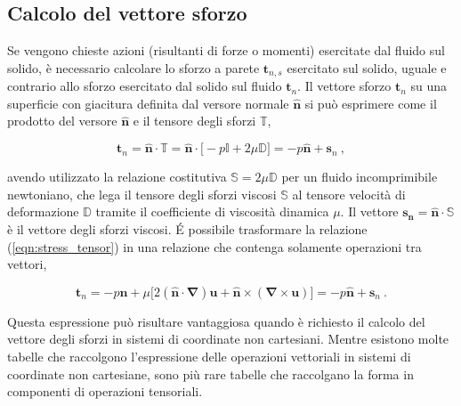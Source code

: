 \subsection{Calcolo del vettore sforzo}
Se vengono chieste azioni (risultanti di forze o momenti) esercitate dal fluido
 sul solido, è necessario calcolare lo sforzo a parete $\bm{t}_{n,s}$ esercitato
 sul solido, uguale e contrario allo sforzo esercitato dal solido sul fluido
 $\bm{t}_{n}$.
Il vettore sforzo $\bm{t}_n$ su una superficie con giacitura definita dal
 versore normale $\bm{\hat{n}}$ si può esprimere come il prodotto del versore $\bm{\hat{n}}$ e il tensore degli sforzi $\mathbb{T}$,
\begin{fBox}
\begin{equation}\label{eqn:stress_tensor}
 \bm{t}_n = \bm{\hat{n}} \cdot \mathbb{T} =
 \bm{\hat{n}} \cdot \big[-p\mathbb{I} + 2\mu\mathbb{D} \big] = 
  - p\bm{\hat{n}} + \bm{s}_n \ ,
\end{equation}
\end{fBox}
avendo utilizzato la relazione costitutiva $\mathbb{S} = 2 \mu \mathbb{D}$ per un fluido incomprimibile newtoniano, che lega il tensore degli sforzi viscosi $\mathbb{S}$ al tensore velocità di deformazione $\mathbb{D}$ tramite il coefficiente di viscosità dinamica $\mu$. Il vettore $\bm{s_n} = \bm{\hat{n}} \cdot \mathbb{S}$ è il vettore degli sforzi viscosi.
%
%
 \'E possibile trasformare la relazione (\ref{eqn:stress_tensor}) in una relazione che contenga solamente operazioni tra vettori,
\begin{fBox}
\begin{equation}\label{eqn:stress_vector}
 \bm{t}_n = -p \bm{\hat{n}} +
 \mu \big[2 (\bm{\hat{n}} \cdot \bm{\nabla}) \bm{u} +
  \bm{\hat{n}} \times (\bm{\nabla} \times \bm{u}) \big]  = 
  - p\bm{\hat{n}} + \bm{s}_n \ .
\end{equation}
\end{fBox}
Questa espressione può risultare vantaggiosa quando è richiesto il calcolo del vettore degli sforzi in sistemi di coordinate non cartesiani. Mentre esistono molte tabelle che raccolgono l'espressione delle operazioni vettoriali in sistemi di coordinate non cartesiane, sono più rare tabelle che raccolgano la forma in componenti di operazioni tensoriali.

